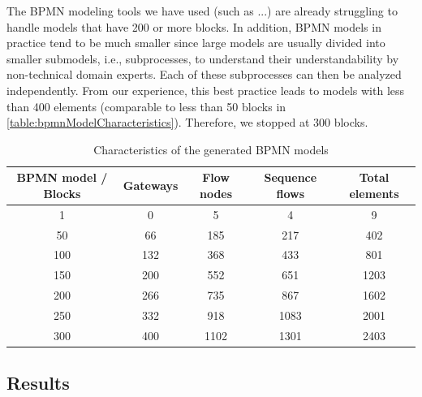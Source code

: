 \documentclass{lmcs} %
\begin{document}

The BPMN modeling tools we have used (such as ...) are already struggling to handle models that have 200 or more blocks.
In addition, BPMN models in practice tend to be much smaller since large models are usually divided into smaller submodels, i.e., subprocesses, to understand their understandability by non-technical domain experts.
Each of these subprocesses can then be analyzed independently.
From our experience, this best practice leads to models with less than 400 elements (comparable to less than 50 blocks in \autoref{table:bpmnModelCharacteristics}). 
Therefore, we stopped at 300 blocks. 


\begin{table}[ht]
\centering
\caption{Characteristics of the generated BPMN models}
\begin{tabular}{| c | c | c | c || c |}
 \hline
 BPMN model / Blocks & Gateways & Flow nodes & Sequence flows & Total elements \\
 \hline\hline
 1 & 0 & 5 & 4 & 9 \\
 \hline
 50 & 66 & 185 & 217 & 402 \\
 \hline
 100 & 132 & 368 & 433 & 801 \\
 \hline
 150 & 200 & 552 & 651 & 1203 \\
 \hline
 200 & 266 & 735 & 867 & 1602 \\
 \hline
 250 & 332 & 918 & 1083 & 2001 \\
 \hline
 300 & 400 & 1102 & 1301 & 2403 \\
 \hline
\end{tabular}
\label{table:bpmnModelCharacteristics}
\end{table}

\subsection{Results}
\end{document}

